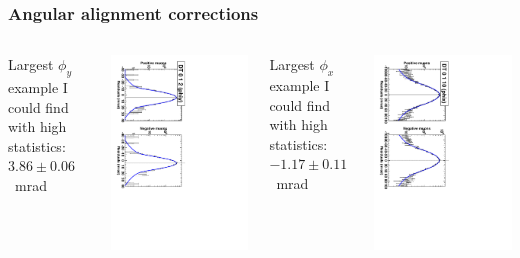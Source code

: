 \documentclass[compress]{beamer}
\begin{document}
\begin{frame}
\frametitle{Angular alignment corrections}

\begin{columns}

Largest $\phi_y$ example I could find with high statistics: $3.86 \pm 0.06$~mrad

\vspace{0.1 cm}
\includegraphics[height=\linewidth, angle=90]{large_phiy_corrections.pdf}

\vspace{0.25 cm}
Largest $\phi_x$ example I could find with high statistics: $-1.17 \pm 0.11$~mrad

\vspace{0.1 cm}
\includegraphics[height=\linewidth, angle=90]{no_significant_phix_corrections.pdf}


\end{columns}
\end{frame}
\end{document}
